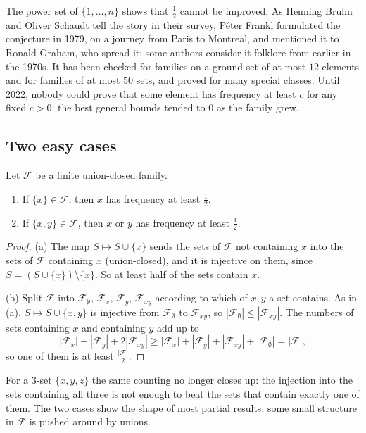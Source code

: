 The power set of $\{1,\dots,n\}$ shows that $\frac12$ cannot be improved. As Henning Bruhn and Oliver Schaudt tell the story in their survey, P\'eter
Frankl formulated the conjecture in 1979, on a journey from Paris to Montreal, and mentioned it to Ronald Graham, who spread it; some authors consider it
folklore from earlier in the 1970s. It has been checked for families on a ground set of at most $12$ elements and for families of at most $50$ sets, and
proved for many special classes. Until 2022, nobody could prove that some element has frequency at least $c$ for any fixed $c>0$: the best general
bounds tended to $0$ as the family grew.

\subsection{Two easy cases}

\begin{proposition}\label{conjectures:prop:ucsmall}
Let $\mathcal F$ be a finite union-closed family.
\begin{enumerate}[label=(\alph*)]
\item If $\{x\}\in\mathcal F$, then $x$ has frequency at least $\frac12$.
\item If $\{x,y\}\in\mathcal F$, then $x$ or $y$ has frequency at least $\frac12$.
\end{enumerate}
\end{proposition}
\begin{proof}
(a) The map $S\mapsto S\cup\{x\}$ sends the sets of $\mathcal F$ not containing $x$ into the sets of $\mathcal F$ containing $x$ (union-closed), and it is
injective on them, since $S=(S\cup\{x\})\setminus\{x\}$. So at least half of the sets contain $x$.

(b) Split $\mathcal F$ into $\mathcal F_\emptyset$, $\mathcal F_x$, $\mathcal F_y$, $\mathcal F_{xy}$ according to which of $x,y$ a set contains. As in (a),
$S\mapsto S\cup\{x,y\}$ is injective from $\mathcal F_\emptyset$ to $\mathcal F_{xy}$, so $|\mathcal F_\emptyset|\le|\mathcal F_{xy}|$. The numbers of sets
containing $x$ and containing $y$ add up to
\[
|\mathcal F_x|+|\mathcal F_y|+2|\mathcal F_{xy}|\ge|\mathcal F_x|+|\mathcal F_y|+|\mathcal F_{xy}|+|\mathcal F_\emptyset|=|\mathcal F|,
\]
so one of them is at least $\frac{|\mathcal F|}2$.
\end{proof}

For a $3$-set $\{x,y,z\}$ the same counting no longer closes up: the injection into the sets containing all three is not enough to beat the
sets that contain exactly one of them. The two cases show the shape of most partial results: some small structure in $\mathcal F$ is pushed around by unions.

